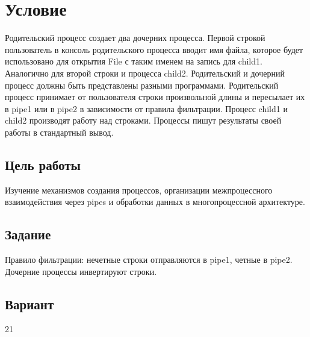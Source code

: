 \section{Условие}
        Родительский процесс создает два дочерних процесса. Первой строкой пользователь в консоль
родительского процесса вводит имя файла, которое будет использовано для открытия File с таким
именем на запись для child1. Аналогично для второй строки и процесса child2. Родительский 
и
дочерний процесс должны быть представлены разными программами. Родительский процесс принимает от пользователя строки произвольной длины и пересылает их в
pipe1 или в pipe2 в зависимости от правила фильтрации. Процесс child1 и child2 производят работу
над строками. Процессы пишут результаты своей работы в стандартный вывод. 

\subsection*{Цель работы}
        Изучение механизмов создания процессов, организации межпроцессного взаимодействия через pipes и обработки данных в многопроцессной архитектуре.

\subsection*{Задание}
    Правило фильтрации: нечетные строки отправляются в pipe1, четные в pipe2.
    Дочерние процессы инвертируют строки.

\subsection*{Вариант}21